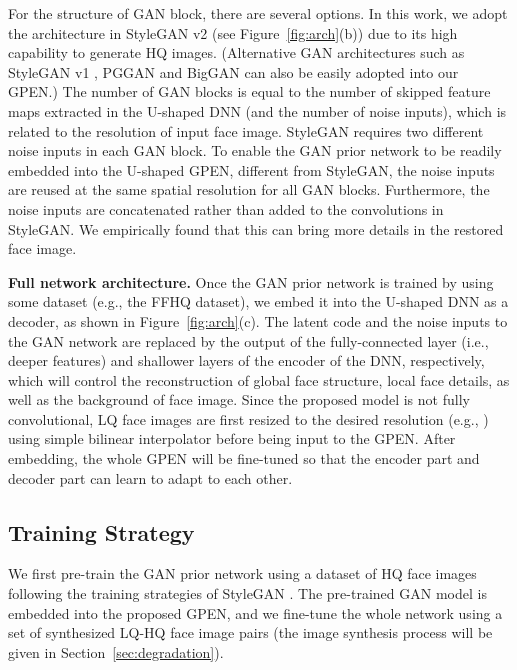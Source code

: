 \documentclass[final]{cvpr}
\begin{document}
For the structure of GAN block, there are several options. In this work, we adopt the architecture in StyleGAN v2 (see Figure~\ref{fig:arch}(b)) due to its high capability to generate HQ images. (Alternative GAN architectures such as StyleGAN v1 \cite{Karras2018StyleGAN}, PGGAN \cite{Karras2018PGGAN} and BigGAN \cite{Brock2019BigGAN} can also be easily adopted into our GPEN.) The number of GAN blocks is equal to the number of skipped feature maps extracted in the U-shaped DNN (and the number of noise inputs), which is related to the resolution of input face image. StyleGAN requires two different noise inputs in each GAN block. To enable the GAN prior network to be readily embedded into the U-shaped GPEN, different from StyleGAN, the noise inputs are reused at the same spatial resolution for all GAN blocks. Furthermore, the noise inputs are concatenated rather than added to the convolutions in StyleGAN. We empirically found that this can bring more details in the restored face image.









\textbf{Full network architecture.}
Once the GAN prior network is trained by using some dataset (e.g., the FFHQ \cite{Karras2018StyleGAN} dataset), we embed it into the U-shaped DNN as a decoder, as shown in Figure~\ref{fig:arch}(c). The latent code  and the noise inputs to the GAN network are replaced by the output of the fully-connected layer (i.e., deeper features) and shallower layers of the encoder of the DNN, respectively, which will control the reconstruction of global face structure, local face details, as well as the background of face image. Since the proposed model is not fully convolutional, LQ face images are first resized to the desired resolution (e.g., ) using simple bilinear interpolator before being input to the GPEN. After embedding, the whole GPEN will be fine-tuned so that the encoder part and decoder part can learn to adapt to each other. 







\subsection{Training Strategy}
\label{sec:training}
We first pre-train the GAN prior network using a dataset of HQ face images following the training strategies of StyleGAN \cite{Karras2018StyleGAN,Karras2019StyleGAN2}. The pre-trained GAN model is embedded into the proposed GPEN, and we fine-tune the whole network using a set of synthesized LQ-HQ face image pairs (the image synthesis process will be given in Section~\ref{sec:degradation}).  
\end{document}
